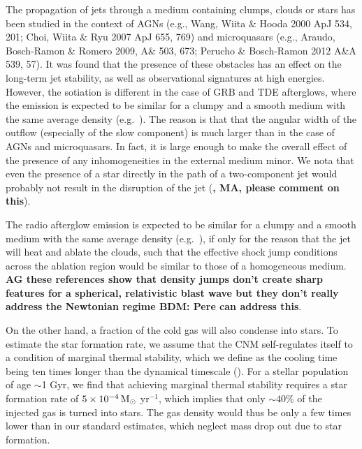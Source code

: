 \documentclass[usenatbib,fleqn]{mnras}
\newcommand{\Msun}{{\rm M_\odot}}
\begin{document}
The propagation of jets through a medium containing clumps, clouds or
stars has been studied in the context of AGNs (e.g., Wang, Wiita \&
Hooda 2000 ApJ 534, 201; Choi, Wiita \& Ryu 2007 ApJ 655, 769) and
microquasars (e.g., Araudo, Bosch-Ramon \& Romero 2009, A\& 503, 673;
Perucho \& Bosch-Ramon 2012 A\&A 539, 57). It was found that the
presence of these obstacles has an effect on the long-term jet
stability, as well as observational signatures at high
energies. However, the sotiation is different in the case of GRB and
TDE afterglows, where the emission is expected to be similar for a
clumpy and a smooth medium with the same average density
(e.g.~\citealt{Nakar&Granot2007,van-Eerten+2009,Mimica&Giannios2011}). The
reason is that that the angular width of the outflow (especially of
the slow component) is much larger than in the case of AGNs and
microquasars. In fact, it is large enough to make the overall effect
of the presence of any inhomogeneities in the external medium
minor. We nota that even the presence of a star directly in the path
of a two-component jet would probably not result in the disruption of
the jet ({\bf, MA, please comment on this}).


The radio afterglow emission is expected to be similar for a clumpy
and a smooth medium with the same average density
(e.g.~\citealt{Nakar&Granot2007,van-Eerten+2009,Mimica&Giannios2011}),
if only for the reason that the jet will heat and ablate the clouds,
such that the effective shock jump conditions across the ablation
region would be similar to those of a homogeneous medium.  {\bf AG
  these references show that density jumps don't create sharp features
  for a spherical, relativistic blast wave but they don't really
  address the Newtonian regime BDM: Pere can address this}.

On the other hand, a fraction of the cold gas will also condense into
stars.  To estimate the star formation rate, we assume that the CNM
self-regulates itself to a condition of marginal thermal stability,
which we define as the cooling time being ten times longer than the
dynamical timescale (\citealt{McCourt+2012}). For a stellar population
of age $\sim$1 Gyr, we find that achieving marginal thermal stability
requires a star formation rate of $5\times 10^{-4} \,\Msun$ yr$^{-1}$,
which implies that only $\sim 40$\% of the injected gas is turned into
stars.  The gas density would thus be only a few times lower than in
our standard estimates, which neglect mass drop out due to star
formation.
\end{document}
